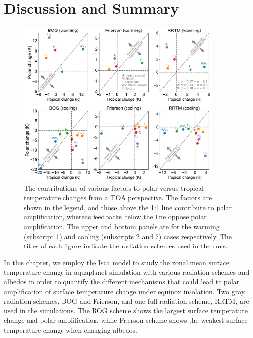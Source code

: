 

\section{Discussion and Summary}

 \begin{figure}[ht]
    \centering
	\includegraphics[width=0.9\textwidth]{figs/polar_amp/contributions_to_polar_amplification.pdf}
	\caption{The contributions of various factors to polar versus tropical temperature changes from a TOA perspective. The factors are shown in the legend, and those above the 1:1 line contribute to polar amplification, whereas feedbacks below the line oppose polar amplification. The upper and bottom panels are for the warming (subscript 1) and cooling (subscripts 2 and 3) cases respectively. The titles of each figure indicate the radiation schemes used in the runs.}
	\label{fig:contribution_pole_vs_tropic}
\end{figure}

In this chapter, we employ the Isca model to study the zonal mean surface temperature change in aquaplanet simulation with various radiation schemes and albedos in order to quantify the different mechanisms that could lead to polar amplification of surface temperature change under equinox insolation. Two gray radiation schemes, BOG and Frierson, and one full radiation scheme, RRTM, are used in the simulations. The BOG scheme shows the largest surface temperature change and polar amplification, while Frierson scheme shows the weakest surface temperature change when changing albedos. %

